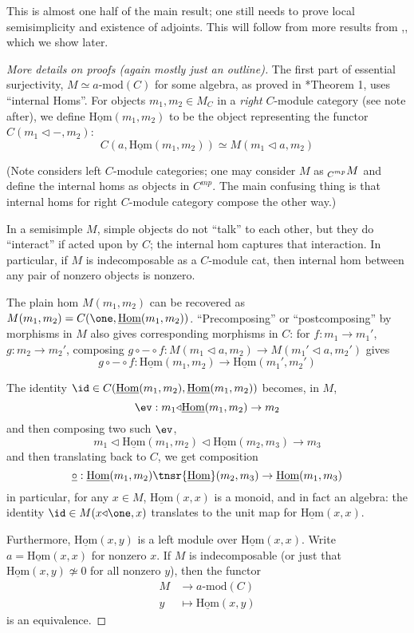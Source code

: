 \documentclass[12pt]{article}
\newcommand{\amod}[1]{{#1\textrm{-mod}}}
\newcommand{\ihom}{{\underline{\textrm{Hom}}}}
\newcommand{\ract}{{\triangleleft}}
\newcommand{\icirc}{{\underline{\circ}}}
\begin{document}
This is almost one half of the main result;
one still needs to prove local semisimplicity
and existence of adjoints.
This will follow from more results from \cite{DSPSa},\cite{DSPSb},
which we show later.


\begin{proof}[More details on proofs (again mostly just an outline)]

The first part of essential surjectivity,
$M \simeq \amod{a}(C)$ for some algebra,
as proved in \cite{Ostrik}*{Theorem 1},
uses ``internal Homs''.
For objects $m_1,m_2 \in M_C$ in a
\emph{right} $C$-module category (see note after),
we define $\ihom(m_1,m_2)$
to be the object representing the functor
$C(m_1 \ract -, m_2)$:
\[
C(a, \ihom(m_1,m_2))
\simeq
M(m_1 \ract a, m_2)
\]

(Note \cite{Ostrik} considers left $C$-module categories;
one may consider $M$ as $\prescript{}{C^{mp}}M$
and define the internal homs as objects in $C^{mp}$.
The main confusing thing is that
internal homs for right $C$-module category
compose the other way.)

In a semisimple $M$,
simple objects do not ``talk'' to each other,
but they do ``interact'' if acted upon by $C$;
the internal hom captures that interaction.
In particular, if $M$ is indecomposable as a $C$-module cat,
then internal hom between any pair of nonzero objects
is nonzero.

The plain hom $M(m_1,m_2)$ can be recovered as
$M(m_1,m_2) = C(\one, \ihom(m_1,m_2))$.
``Precomposing'' or ``postcomposing'' by morphisms in $M$
also gives corresponding morphisms in $C$:
for $f: m_1 \to m_1'$, $g: m_2 \to m_2'$,
composing $g \circ - \circ f: M(m_1 \ract a, m_2)
\to M(m_1' \ract a, m_2')$ gives
\[
g \circ - \circ f : \ihom(m_1, m_2) \to \ihom(m_1', m_2')
\]

The identity $\id \in C(\ihom(m_1,m_2), \ihom(m_1,m_2))$
becomes, in $M$,
\[
\ev : m_1 \ract \ihom(m_1,m_2) \to m_2
\]
and then composing two such $\ev$,
\[
m_1 \ract \ihom(m_1,m_2) \ract \ihom(m_2,m_3) \to m_3
\]
and then translating back to $C$, we get composition
\[
\icirc: \ihom(m_1,m_2) \tnsr \ihom(m_2,m_3) \to \ihom(m_1,m_3)
\]
in particular, for any $x\in M$, $\ihom(x,x)$ is a monoid,
and in fact an algebra:
the identity $\id \in M(x \ract \one,x)$ translates to
the unit map for $\ihom(x,x)$.


Furthermore, $\ihom(x,y)$ is a left module over $\ihom(x,x)$.
Write $a = \ihom(x,x)$ for nonzero $x$.
If $M$ is indecomposable
(or just that $\ihom(x,y) \not\simeq 0$ for all nonzero $y$),
then the functor
\begin{align*}
M &\to \amod{a}(C)
\\
y &\mapsto \ihom(x,y)
\end{align*}
is an equivalence.



\end{proof}
\end{document}
